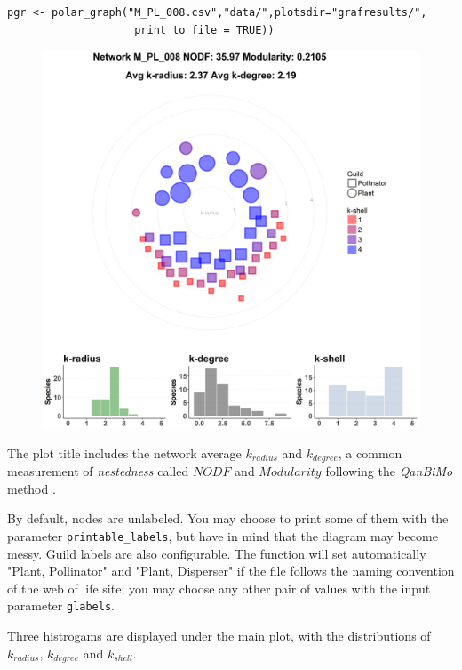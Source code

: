\documentclass[12pt]{article}
\begin{document}
\fontsize{3.5mm}{3.5mm}\selectfont
\begin{verbatim}
pgr <- polar_graph("M_PL_008.csv","data/",plotsdir="grafresults/",
                    print_to_file = TRUE))
\end{verbatim}
\normalsize

\begin{figure}[h!]
\centering
\includegraphics[scale=0.4]{M_PL_008_polar.png}
\label{fig:M_PL_034_polar}
\end{figure}

The plot title includes the network average ${k}_{radius}$ and ${k}_{degree}$, a common measurement of \textit{nestedness} called $NODF$ \cite{almeida2008consistent} and $Modularity$ following the \textit{QanBiMo} method \cite{dormann2014method}.

By default, nodes are unlabeled. You may choose to print some of them with the parameter \texttt{printable\_labels}, but have in mind that the
diagram may become messy. Guild labels are also configurable. The function will set automatically "Plant, Pollinator" and "Plant, Disperser" if the
file follows the naming convention of the web of life site; you may choose any other pair of values with the input parameter \texttt{glabels}.

Three histrogams are displayed under the main plot, with the distributions of $k_{radius}$, $k_{degree}$ and $k_{shell}$. 
\end{document}
